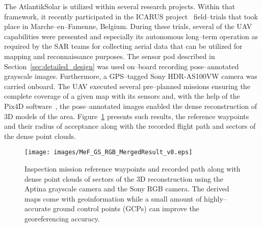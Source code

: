 The AtlantikSolar is utilized within several research projects. Within that framework, it recently participated in the ICARUS project~\cite{ICARUSsite} field--trials that took place in Marche--en--Famenne, Belgium. During these trials, several of the UAV capabilities were presented and especially its autonomous long--term operation as required by the SAR teams for collecting aerial data that can be utilized for mapping and reconnaissance purposes. The sensor pod described in Section~\ref{sec:detailed_design} was used on--board recording pose--annotated grayscale images. Furthermore, a GPS--tagged Sony HDR-AS100VW camera was carried onboard. The UAV executed several pre--planned missions ensuring the complete coverage of a given map with its sensors and, with the help of the Pix4D software~\cite{Pix4Dsite}, the pose--annotated images enabled the dense reconstruction of $3\textrm{D}$ models of the area. Figure~\ref{fig:mef_icarus_reconstruction} presents such results, the reference waypoints and their radius of acceptance along with the recorded flight path and sectors of the dense point clouds. 


%
\begin{figure}[htbp]
\begin{center}
  \texttt{[image: images/MeF\_GS\_RGB\_MergedResult\_v8.eps]} %
\end{center}
\caption{Inspection mission reference waypoints and recorded path along with dense point clouds of sectors of the $3\textrm{D}$ reconstruction using the Aptina grayscale camera and the Sony RGB camera. The derived maps come with geoinformation while a small amount of highly--accurate ground control points (GCPs) can improve the georeferencing accuracy.  }
\label{fig:mef_icarus_reconstruction}
\end{figure}
%
